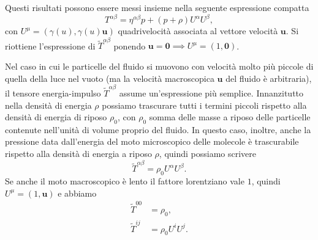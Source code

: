 Questi risultati possono essere messi insieme nella seguente espressione
compatta
\begin{equation}
  T^{\alpha\beta} = \eta^{\alpha\beta}p + (p + \rho)U^{\alpha}U^{\beta},
\end{equation}
con $U^{\mu} = (\gamma(u), \gamma(u) \bm{u})$ quadrivelocità associata al
vettore velocità $\bm{u}$.  Si riottiene l'espressione di
$\tilde T^{\alpha\beta}$ ponendo
$\bm{u} = \bm{0} \implies U^{\mu} = (1, \bm{0})$.

Nel caso in cui le particelle del fluido si muovono con velocità molto più
piccole di quella della luce nel vuoto (ma la velocità macroscopica $\bm{u}$ del
fluido è arbitraria), il tensore energia-impulso $\tilde T^{\alpha\beta}$ assume
un'espressione più semplice.  Innanzitutto nella densità di energia $\rho$
possiamo trascurare tutti i termini piccoli rispetto alla densità di energia di
riposo $\rho_{0}$, con $\rho_{0}$ somma delle masse a riposo delle particelle
contenute nell'unità di volume proprio del fluido.  In questo caso, inoltre,
anche la pressione data dall'energia del moto microscopico delle molecole è
trascurabile rispetto alla densità di energia a riposo $\rho$, quindi possiamo
scrivere
\begin{equation}
  \tilde T^{\alpha\beta} = \rho_{0} U^{\alpha} U^{\beta}.
\end{equation}
Se anche il moto macroscopico è lento il fattore lorentziano vale $1$, quindi
$U^{\mu}= (1, \bm{u})$ e abbiamo
\begin{subequations}
  \begin{align}
    \tilde T^{00} &= \rho_{0}, \\
    \tilde T^{ij} &= \rho_{0} U^{i} U^{j}.
  \end{align}
\end{subequations}


